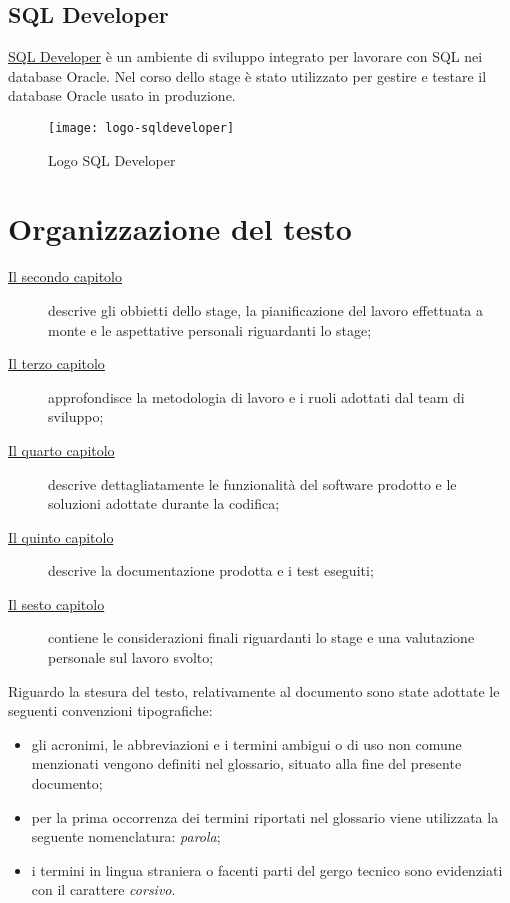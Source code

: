 \subsection{SQL Developer}
\href{https://www.oracle.com/database/technologies/appdev/sqldeveloper-landing.html}{SQL Developer} è un ambiente di sviluppo integrato per lavorare con SQL nei database Oracle. Nel corso dello stage è stato utilizzato per gestire e testare il database Oracle usato in produzione.
\begin{figure}[h]
    \begin{center}
    \texttt{[image: logo-sqldeveloper]}
    \caption{Logo SQL Developer}
    \label{fig:figure13}
    \end{center}
\end{figure}

\section{Organizzazione del testo}

\begin{description}
    \item[{\hyperref[cap:obbiettivi-pianificazione]{Il secondo capitolo}}] descrive gli obbietti dello stage, la pianificazione del lavoro effettuata a monte e le aspettative personali riguardanti lo stage;
    
    \item[{\hyperref[cap:metodologia-lavoro]{Il terzo capitolo}}] approfondisce la metodologia di lavoro e i ruoli adottati dal team di sviluppo;
    
    \item[{\hyperref[cap:prodotto-sw]{Il quarto capitolo}}] descrive dettagliatamente le funzionalità del software prodotto e le soluzioni adottate durante la codifica;
    
    \item[{\hyperref[cap:docs-test]{Il quinto capitolo}}] descrive la documentazione prodotta e i test eseguiti;
    
    \item[{\hyperref[cap:considerazioni]{Il sesto capitolo}}] contiene le considerazioni finali riguardanti lo stage e una valutazione personale sul lavoro svolto;

\end{description}

Riguardo la stesura del testo, relativamente al documento sono state adottate le seguenti convenzioni tipografiche:
\begin{itemize}
	\item gli acronimi, le abbreviazioni e i termini ambigui o di uso non comune menzionati vengono definiti nel glossario, situato alla fine del presente documento;
	\item per la prima occorrenza dei termini riportati nel glossario viene utilizzata la seguente nomenclatura: \emph{parola}\glsfirstoccur{};
	\item i termini in lingua straniera o facenti parti del gergo tecnico sono evidenziati con il carattere \emph{corsivo}.
\end{itemize}